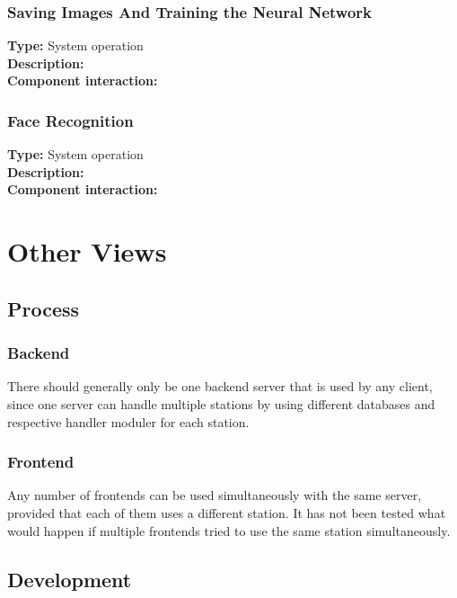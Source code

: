 \documentclass[11pt]{article}
\begin{document}
\subsubsection{Saving Images And Training the Neural Network}
\label{sec:add-train}
\textbf{Type:} System operation\\
\textbf{Description:}\\
\textbf{Component interaction:}\\

\subsubsection{Face Recognition}
\label{sec:recognition}
\textbf{Type:} System operation\\
\textbf{Description:}\\
\textbf{Component interaction:}\\

\section{Other Views}


\subsection{Process}
\subsubsection*{Backend}
There should generally only be one backend server that is used by any
client, since one server can handle multiple stations by using
different databases and respective handler moduler for each station.

\subsubsection*{Frontend}
Any number of frontends can be used simultaneously with the same
server, provided that each of them uses a different station. It has
not been tested what would happen if multiple frontends tried to use the
same station simultaneously.

\subsection{Development}
\end{document}
